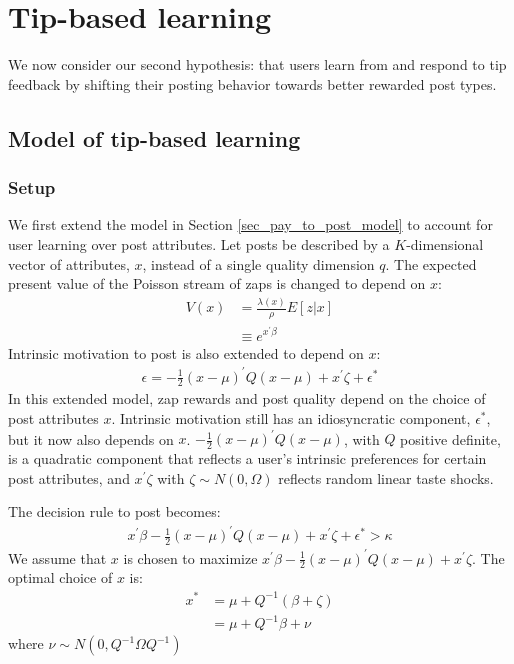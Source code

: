 \section{Tip-based learning}\label{sec_v4v}

We now consider our second hypothesis: that users learn from and respond to tip feedback by shifting their posting behavior towards better rewarded post types.

\subsection{Model of tip-based learning}

\subsubsection*{Setup}

We first extend the model in Section \ref{sec_pay_to_post_model} to account for user learning over post attributes. Let posts be described by a $K$-dimensional vector of attributes, $x$, instead of a single quality dimension $q$. The expected present value of the Poisson stream of zaps is changed to depend on $x$:
\begin{align}
V(x) &= \frac{\lambda(x)}{\rho} E[z | x] \nonumber \\
&\equiv e^{x^\prime \beta}
\end{align}
Intrinsic motivation to post is also extended to depend on $x$:
\begin{align}
\epsilon = -\tfrac{1}{2}(x - \mu)^\prime Q (x - \mu) + x^\prime \zeta + \epsilon^\ast
\end{align}
In this extended model, zap rewards and post quality depend on the choice of post attributes $x$. Intrinsic motivation still has an idiosyncratic component, $\epsilon^\ast$, but it now also depends on $x$. $-\tfrac{1}{2}(x-\mu)^\prime Q  (x-\mu)$, with $Q$ positive definite, is a quadratic component that reflects a user's intrinsic preferences for certain post attributes, and $x^\prime \zeta$ with $\zeta \sim N(0,\Omega)$ reflects random linear taste shocks. 

The decision rule to post becomes:
\begin{align}
x^\prime\beta - \tfrac{1}{2}(x - \mu)^\prime Q (x - \mu) + x^\prime \zeta + \epsilon^\ast > \kappa \label{eq_v4v_choice}
\end{align}
We assume that $x$ is chosen to maximize $x^\prime \beta - \tfrac{1}{2}(x-\mu)^\prime Q (x-\mu) + x^\prime \zeta$. The optimal choice of $x$ is:
\begin{align}
x^\ast &= \mu + Q^{-1} (\beta + \zeta) \nonumber \\
&= \mu + Q^{-1} \beta + \nu \label{eq_v4v_xstar}
\end{align}
where $\nu \sim N(0, Q^{-1} \Omega Q^{-1})$

